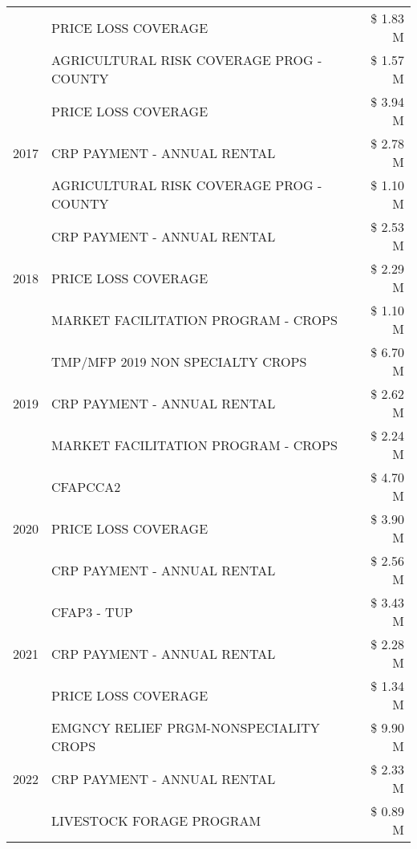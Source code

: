\begin{tabular}{llr}
 & PRICE LOSS COVERAGE & \$ 1.83 M \\
 & AGRICULTURAL RISK COVERAGE PROG - COUNTY & \$ 1.57 M \\
\cline{1-3}
\multirow[t]{3}{*}{2017} & PRICE LOSS COVERAGE & \$ 3.94 M \\
 & CRP PAYMENT - ANNUAL RENTAL & \$ 2.78 M \\
 & AGRICULTURAL RISK COVERAGE PROG - COUNTY & \$ 1.10 M \\
\cline{1-3}
\multirow[t]{3}{*}{2018} & CRP PAYMENT - ANNUAL RENTAL & \$ 2.53 M \\
 & PRICE LOSS COVERAGE & \$ 2.29 M \\
 & MARKET FACILITATION PROGRAM - CROPS & \$ 1.10 M \\
\cline{1-3}
\multirow[t]{3}{*}{2019} & TMP/MFP 2019 NON SPECIALTY CROPS & \$ 6.70 M \\
 & CRP PAYMENT - ANNUAL RENTAL & \$ 2.62 M \\
 & MARKET FACILITATION PROGRAM - CROPS & \$ 2.24 M \\
\cline{1-3}
\multirow[t]{3}{*}{2020} & CFAPCCA2 & \$ 4.70 M \\
 & PRICE LOSS COVERAGE & \$ 3.90 M \\
 & CRP PAYMENT - ANNUAL RENTAL & \$ 2.56 M \\
\cline{1-3}
\multirow[t]{3}{*}{2021} & CFAP3 - TUP & \$ 3.43 M \\
 & CRP PAYMENT - ANNUAL RENTAL & \$ 2.28 M \\
 & PRICE LOSS COVERAGE & \$ 1.34 M \\
\cline{1-3}
\multirow[t]{3}{*}{2022} & EMGNCY RELIEF PRGM-NONSPECIALITY CROPS & \$ 9.90 M \\
 & CRP PAYMENT - ANNUAL RENTAL & \$ 2.33 M \\
 & LIVESTOCK FORAGE PROGRAM & \$ 0.89 M \\
\cline{1-3}
\bottomrule
\end{tabular}
